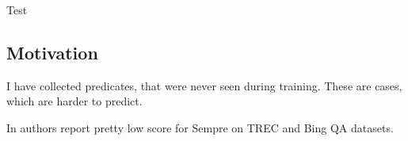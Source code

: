 Test

\subsection{Motivation}

I have collected predicates, that were never seen during training.
These are cases, which are harder to predict.

In \cite{Sun:2015:ODQ:2736277.2741651} authors report pretty low score for Sempre on TREC and Bing QA datasets.
